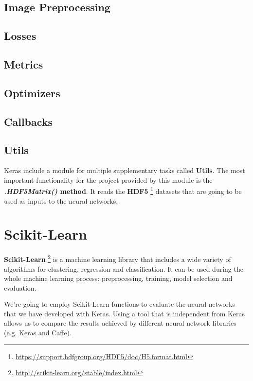 \subsection*{Image Preprocessing}
\subsection*{Losses}
\subsection*{Metrics}
\subsection*{Optimizers}
\subsection*{Callbacks}
\subsection*{Utils}
Keras include a module for multiple supplementary tasks called \textbf{Utils}. The most important functionality for the project provided by this module is the \textbf{\textit{.HDF5Matrix()} method}. It reads the \textbf{HDF5} \footnote{\url{https://support.hdfgroup.org/HDF5/doc/H5.format.html}} datasets that are going to be used as inputs to the neural networks.

\section{Scikit-Learn}
\textbf{Scikit-Learn} \footnote{\url {http://scikit-learn.org/stable/index.html}} is a machine learning library that includes a wide variety of algorithms for clustering, regression and classification. It can be used during the whole machine learning process: preprocessing, training, model selection and evaluation.

We're going to employ Scikit-Learn functions to evaluate the neural networks that we have developed with Keras. Using a tool that is independent from Keras allows us to compare the results achieved by different neural network libraries (e.g. Keras and Caffe).

